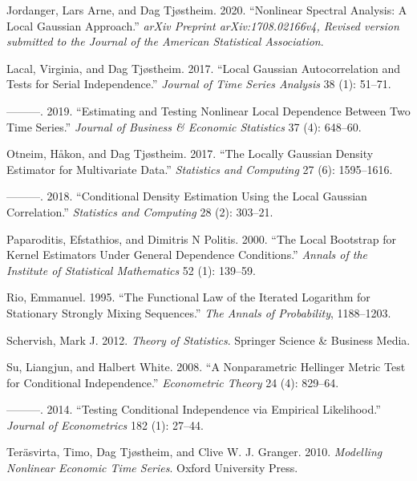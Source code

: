 \documentclass[
  12pt,
  letterpaper]{article}
\numberwithin{equation}{section}
\newlength{\cslhangindent}
\newenvironment{cslreferences}%
  {\setlength{\parindent}{0pt}%
  \everypar{\setlength{\hangindent}{\cslhangindent}}\ignorespaces}%
  {\par}
\begin{document}
\begin{cslreferences}
\leavevmode\hypertarget{ref-jordanger2017nonlinear}{}%
Jordanger, Lars Arne, and Dag Tjøstheim. 2020. ``Nonlinear Spectral Analysis: A Local Gaussian Approach.'' \emph{arXiv Preprint arXiv:1708.02166v4, Revised version submitted to the Journal of the American Statistical Association}.

\leavevmode\hypertarget{ref-lacal2017local}{}%
Lacal, Virginia, and Dag Tjøstheim. 2017. ``Local Gaussian Autocorrelation and Tests for Serial Independence.'' \emph{Journal of Time Series Analysis} 38 (1): 51--71.

\leavevmode\hypertarget{ref-lacal2018estimating}{}%
---------. 2019. ``Estimating and Testing Nonlinear Local Dependence Between Two Time Series.'' \emph{Journal of Business \& Economic Statistics} 37 (4): 648--60.

\leavevmode\hypertarget{ref-otneim2017locally}{}%
Otneim, Håkon, and Dag Tjøstheim. 2017. ``The Locally Gaussian Density Estimator for Multivariate Data.'' \emph{Statistics and Computing} 27 (6): 1595--1616.

\leavevmode\hypertarget{ref-otneim2017conditional}{}%
---------. 2018. ``Conditional Density Estimation Using the Local Gaussian Correlation.'' \emph{Statistics and Computing} 28 (2): 303--21.

\leavevmode\hypertarget{ref-paparoditis2000local}{}%
Paparoditis, Efstathios, and Dimitris N Politis. 2000. ``The Local Bootstrap for Kernel Estimators Under General Dependence Conditions.'' \emph{Annals of the Institute of Statistical Mathematics} 52 (1): 139--59.

\leavevmode\hypertarget{ref-rio1995functional}{}%
Rio, Emmanuel. 1995. ``The Functional Law of the Iterated Logarithm for Stationary Strongly Mixing Sequences.'' \emph{The Annals of Probability}, 1188--1203.

\leavevmode\hypertarget{ref-schervish1995theory}{}%
Schervish, Mark J. 2012. \emph{Theory of Statistics}. Springer Science \& Business Media.

\leavevmode\hypertarget{ref-su2008nonparametric}{}%
Su, Liangjun, and Halbert White. 2008. ``A Nonparametric Hellinger Metric Test for Conditional Independence.'' \emph{Econometric Theory} 24 (4): 829--64.

\leavevmode\hypertarget{ref-su2014testing}{}%
---------. 2014. ``Testing Conditional Independence via Empirical Likelihood.'' \emph{Journal of Econometrics} 182 (1): 27--44.

\leavevmode\hypertarget{ref-terasvirta2010modelling}{}%
Teräsvirta, Timo, Dag Tjøstheim, and Clive W. J. Granger. 2010. \emph{Modelling Nonlinear Economic Time Series}. Oxford University Press.


\end{cslreferences}
\end{document}
